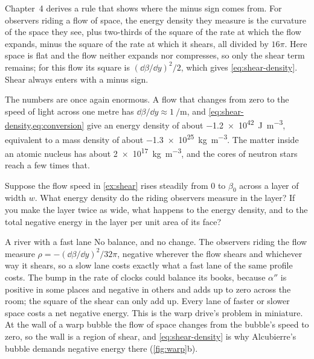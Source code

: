 Chapter~4 derives a rule that shows where the minus sign comes from. For observers riding a flow of space, the energy density they measure is
the curvature of the space they see, plus two-thirds of the square of the rate
at which the flow expands, minus the square of the rate at which it shears,
all divided by $16\pi$. Here space is flat and the flow neither expands nor
compresses, so only the shear term remains; for this flow its square is
$(\dd\beta/\dd y)^{2}/2$, which gives \cref{eq:shear-density}. Shear always
enters with a minus sign.

The numbers are once again enormous. A flow that changes from zero to the speed
of light across one metre has $\dd\beta/\dd y \approx \SI{1}{\per\metre}$, and
\cref{eq:shear-density,eq:conversion} give an energy density of about
\SI{-1.2e42}{\joule\per\cubic\metre}, equivalent to a mass density of about
\SI{-1.3e25}{\kilogram\per\cubic\metre}. The matter inside an atomic nucleus
has about \SI{+2e17}{\kilogram\per\cubic\metre}, and the cores of neutron
stars reach a few times that.

\begin{checkpoint}[label=chk:shear-width]
Suppose the flow speed in \cref{ex:shear} rises steadily from $0$ to
$\beta_{0}$ across a layer of width $w$. What energy density do the riding
observers measure in the layer? If you make the layer twice as wide, what
happens to the energy density, and to the total negative energy in the layer
per unit area of its face?
\end{checkpoint}

\begin{revisited}{A river with a fast lane}
No balance, and no change. The observers riding the flow measure
$\rho = -(\dd\beta/\dd y)^{2}/32\pi$, negative wherever the flow shears and
whichever way it shears, so a slow lane costs exactly what a fast lane of the
same profile costs. The bump in the rate of clocks could balance its books,
because $\alpha''$ is positive in some places and negative in others and adds
up to zero across the room; the square of the shear can only add up. Every
lane of faster or slower space costs a net negative energy. This is the warp
drive's problem in miniature. At the wall of a warp bubble the
flow of space changes from the bubble's speed to zero, so the wall is a region
of shear, and \cref{eq:shear-density} is why Alcubierre's bubble demands
negative energy there (\cref{fig:warp}b).
\end{revisited}


